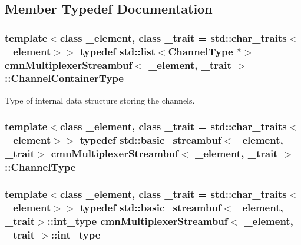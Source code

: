\subsection{Member Typedef Documentation}
\hypertarget{classcmn_multiplexer_streambuf_a3b414c7f89b55584aef7c8b655bc03ea}{
\subsubsection[{Channel\-Container\-Type}]{\setlength{\rightskip}{0pt plus 5cm}template$<$class \-\_\-element, class \-\_\-trait = std\-::char\-\_\-traits$<$\-\_\-element$>$$>$ typedef std\-::list$<${\bf Channel\-Type} $\ast$$>$ {\bf cmn\-Multiplexer\-Streambuf}$<$ \-\_\-element, \-\_\-trait $>$\-::{\bf Channel\-Container\-Type}}}\label{classcmn_multiplexer_streambuf_a3b414c7f89b55584aef7c8b655bc03ea}
Type of internal data structure storing the channels. \hypertarget{classcmn_multiplexer_streambuf_a7eb353f0b5fed1a2c8707712aac82095}{
\subsubsection[{Channel\-Type}]{\setlength{\rightskip}{0pt plus 5cm}template$<$class \-\_\-element, class \-\_\-trait = std\-::char\-\_\-traits$<$\-\_\-element$>$$>$ typedef std\-::basic\-\_\-streambuf$<$\-\_\-element, \-\_\-trait$>$ {\bf cmn\-Multiplexer\-Streambuf}$<$ \-\_\-element, \-\_\-trait $>$\-::{\bf Channel\-Type}}}\label{classcmn_multiplexer_streambuf_a7eb353f0b5fed1a2c8707712aac82095}
\hypertarget{classcmn_multiplexer_streambuf_aaa63d7e4ef3d7ef78dee540971ec88e9}{
\subsubsection[{int\-\_\-type}]{\setlength{\rightskip}{0pt plus 5cm}template$<$class \-\_\-element, class \-\_\-trait = std\-::char\-\_\-traits$<$\-\_\-element$>$$>$ typedef std\-::basic\-\_\-streambuf$<$\-\_\-element, \-\_\-trait$>$\-::{\bf int\-\_\-type} {\bf cmn\-Multiplexer\-Streambuf}$<$ \-\_\-element, \-\_\-trait $>$\-::{\bf int\-\_\-type}}}\label{classcmn_multiplexer_streambuf_aaa63d7e4ef3d7ef78dee540971ec88e9}


